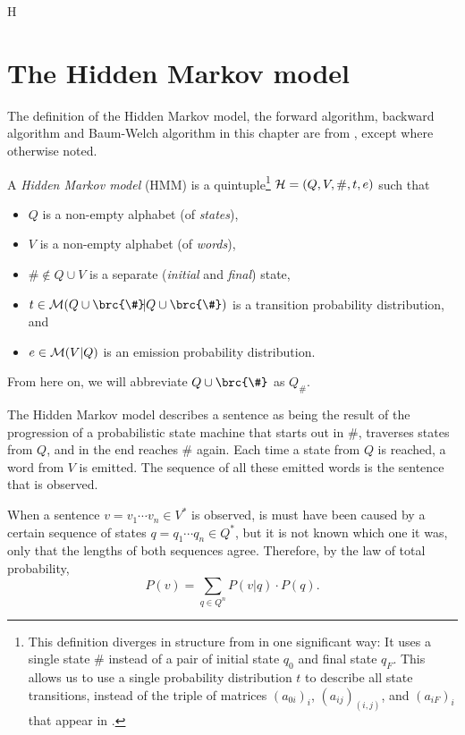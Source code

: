 H\chapter{The Hidden Markov model}

The definition of the Hidden Markov model, the forward algorithm, backward
algorithm and Baum-Welch algorithm in this chapter are from
\cite[pp.~210]{jm09}, except where otherwise noted.

\begin{definition}
 A \emph{Hidden Markov model} (HMM) is a quintuple\footnote{This definition
 diverges in structure from \cite{jm09} in one significant way: It uses a
 single state $\#$ instead of a pair of initial state $q_0$ and final state
 $q_F$. This allows us to use a single probability distribution $t$ to describe
 all state transitions, instead of the triple of matrices $(a_{0i})_i$,
 $(a_{ij})_{(i,j)}$, and $(a_{iF})_i$ that appear in \cite{jm09}.} $\mathcal H =
 (Q,V,\#,t,e)$ such that
 \begin{itemize}\setlength\itemsep{-0.3em}
  \item $Q$ is a non-empty alphabet (of \emph{states}),
  \item $V$ is a non-empty alphabet (of \emph{words}),
  \item $\#\notin Q\cup V$ is a separate (\emph{initial} and \emph{final}) state,
  \item $t\in\um(Q\cup\brc{\#}\!|Q\cup\brc{\#})$ is a transition probability distribution, and
  \item $e\in\mathcal M(V|Q)$ is an emission probability distribution. \qedhere
 \end{itemize}
\end{definition}

From here on, we will abbreviate $Q\cup\brc{\#}$ as $Q_\#$.

The Hidden Markov model describes a sentence as being the result of the
progression of a probabilistic state machine that starts out in $\#$, traverses
states from $Q$, and in the end reaches $\#$ again. Each time a state from $Q$
is reached, a word from $V$ is emitted. The sequence of all these emitted words
is the sentence that is observed.

When a sentence $v = v_1\cdots v_n\in V^*$ is observed, is must have been
caused by a certain sequence of states $q = q_1\cdots q_n\in Q^*$, but it is
not known which one it was, only that the lengths of both sequences agree.
Therefore, by the law of total probability,
\[
 P(v) = \sum_{q\in Q^n} P(v|q) \cdot P(q).
\]

